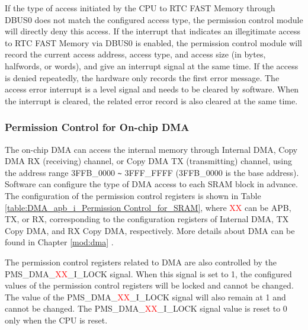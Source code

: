 \documentclass[main\_\_EN.tex]{subfiles}
\begin{document}
If the type of access initiated by the CPU to RTC FAST Memory through DBUS0 does not match the configured access type, the permission control module will directly deny this access. If the interrupt that indicates an illegitimate access to RTC FAST Memory via DBUS0 is enabled, the permission control module will record the current access address, access type, and access size (in bytes, halfwords, or words), and give an interrupt signal at the same time. If the access is denied repeatedly, the hardware only records the first error message. The access error interrupt is a level signal and needs to be cleared by software. When the interrupt is cleared, the related error record is also cleared at the same time.

\subsubsection{Permission Control for On-chip DMA}\label{DMAPermissionControl}
The on-chip DMA can access the internal memory through Internal DMA, Copy DMA RX (receiving) channel, or Copy DMA TX (transmitting) channel, using the address range \hexprefix{}3FFB\_0000 \verb+~+ \hexprefix{}3FFF\_FFFF (\hexprefix{}3FFB\_0000 is the base address). Software can configure the type of DMA access to each SRAM block in advance. The configuration of the permission control registers is shown in Table \ref{table:DMA_apb_i_Permission Control_for_SRAM}, where \textcolor{red}{XX} can be APB, TX, or RX, corresponding to the configuration registers of Internal DMA, TX Copy DMA, and RX Copy DMA, respectively. More details about DMA can be found in Chapter \ref{mod:dma} \textit{}.

The permission control registers related to DMA are also controlled by the PMS\_DMA\_\textcolor{red}{XX}\_I\_LOCK signal. When this signal is set to 1, the configured values of the permission control registers will be locked and cannot be changed. The value of the PMS\_DMA\_\textcolor{red}{XX}\_I\_LOCK signal will also remain at 1 and cannot be changed. The PMS\_DMA\_\textcolor{red}{XX}\_I\_LOCK signal value is reset to 0 only when the CPU is reset.
\end{document}
